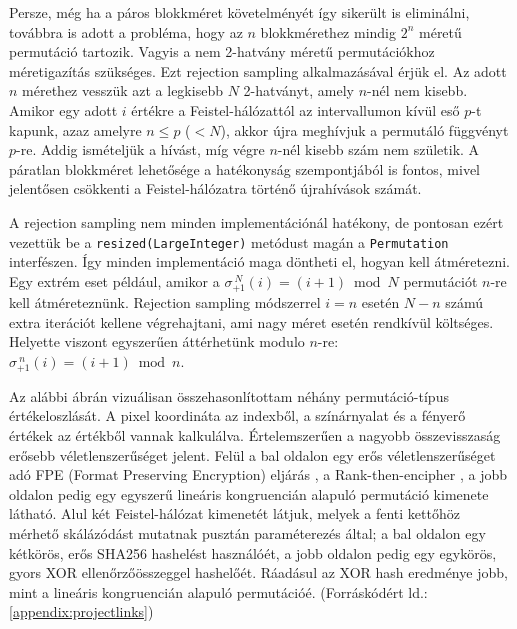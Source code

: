 \documentclass[
    parspace,
    noindent,
    nohyp,
]{elteiktdk}[2023/04/10]
\newcommand{\todoref}[1]{\todo[inline, noinlinepar, color=red, textcolor=white, inlinewidth=0.6cm, caption={#1}]{\large \textbf{×}}}
\begin{document}
Persze, még ha a páros blokkméret követelményét így sikerült is eliminálni,
továbbra is adott a probléma, hogy az $n$ blokkmérethez mindig $2^n$ méretű permutáció tartozik.
Vagyis a nem 2-hatvány méretű permutációkhoz méretigazítás szükséges.
Ezt rejection sampling alkalmazásával érjük el.
Az adott $n$ mérethez vesszük azt a legkisebb $N$ 2-hatványt, amely $n$-nél nem kisebb.
Amikor egy adott $i$ értékre a Feistel-hálózattól az intervallumon kívül eső $p$-t kapunk,
azaz amelyre $n \leq p$ ($< N$), akkor újra meghívjuk a permutáló függvényt $p$-re.
Addig ismételjük a hívást, míg végre $n$-nél kisebb szám nem születik.
A páratlan blokkméret lehetősége a hatékonyság szempontjából is fontos,
mivel jelentősen csökkenti a Feistel-hálózatra történő újrahívások számát.

A rejection sampling nem minden implementációnál hatékony,
de pontosan ezért vezettük be a \texttt{resized(LargeInteger)} metódust
magán a \texttt{Permutation} interfészen.
Így minden implementáció maga döntheti el, hogyan kell átméretezni.
Egy extrém eset például, amikor a $\sigma_{+1}^{~N}(i) = (i + 1) \bmod N$ permutációt $n$-re kell átméreteznünk.
Rejection sampling módszerrel $i = n$ esetén $N - n$ számú extra iterációt kellene végrehajtani,
ami nagy méret esetén rendkívül költséges.
Helyette viszont egyszerűen áttérhetünk modulo $n$-re: $\sigma_{+1}^{~n}(i) = (i + 1) \bmod n$.

Az alábbi ábrán vizuálisan összehasonlítottam néhány permutáció-típus értékeloszlását.
A pixel koordináta az indexből, a színárnyalat és a fényerő értékek az értékből vannak kalkulálva.
Értelemszerűen a nagyobb összevisszaság erősebb véletlenszerűséget jelent.
Felül a bal oldalon egy erős véletlenszerűséget adó FPE (Format Preserving Encryption) eljárás
\todoref{+CITE, és részletezni: FPE},
a Rank-then-encipher\protect\cite{Bellare2009FormatPreservingE}
\todoref{+CITE, és részletezni: Rank-then-encipher},
a jobb oldalon pedig egy egyszerű lineáris kongruencián alapuló permutáció kimenete látható.
Alul két Feistel-hálózat kimenetét látjuk,
melyek a fenti kettőhöz mérhető skálázódást mutatnak pusztán paraméterezés által;
a bal oldalon egy kétkörös, erős SHA256 hashelést használóét,
a jobb oldalon pedig egy egykörös, gyors XOR ellenőrzőösszeggel hashelőét.
Ráadásul az XOR hash eredménye jobb, mint a lineáris kongruencián alapuló permutációé.
(Forráskódért ld.: \autoref{appendix:projectlinks})
\end{document}
